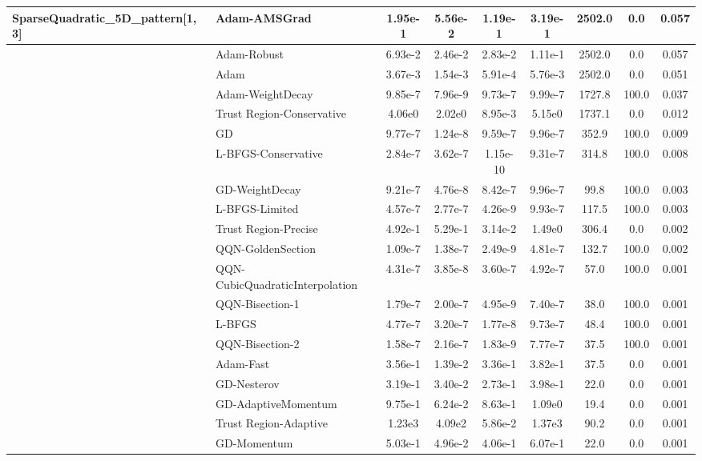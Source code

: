 \documentclass{article}
\begin{document}
\begin{longtable}{|l|l|c|c|c|c|c|c|c|}
SparseQuadratic\_5D\_pattern[1, 3] & \textbf{Adam-AMSGrad} & 1.95e-1 & 5.56e-2 & 1.19e-1 & 3.19e-1 & 2502.0 & 0.0 & 0.057 \\
\hline
 & Adam-Robust & 6.93e-2 & 2.46e-2 & 2.83e-2 & 1.11e-1 & 2502.0 & 0.0 & 0.057 \\
\hline
 & Adam & 3.67e-3 & 1.54e-3 & 5.91e-4 & 5.76e-3 & 2502.0 & 0.0 & 0.051 \\
\hline
 & Adam-WeightDecay & 9.85e-7 & 7.96e-9 & 9.73e-7 & 9.99e-7 & 1727.8 & 100.0 & 0.037 \\
\hline
 & Trust Region-Conservative & 4.06e0 & 2.02e0 & 8.95e-3 & 5.15e0 & 1737.1 & 0.0 & 0.012 \\
\hline
 & GD & 9.77e-7 & 1.24e-8 & 9.59e-7 & 9.96e-7 & 352.9 & 100.0 & 0.009 \\
\hline
 & L-BFGS-Conservative & 2.84e-7 & 3.62e-7 & 1.15e-10 & 9.31e-7 & 314.8 & 100.0 & 0.008 \\
\hline
 & GD-WeightDecay & 9.21e-7 & 4.76e-8 & 8.42e-7 & 9.96e-7 & 99.8 & 100.0 & 0.003 \\
\hline
 & L-BFGS-Limited & 4.57e-7 & 2.77e-7 & 4.26e-9 & 9.93e-7 & 117.5 & 100.0 & 0.003 \\
\hline
 & Trust Region-Precise & 4.92e-1 & 5.29e-1 & 3.14e-2 & 1.49e0 & 306.4 & 0.0 & 0.002 \\
\hline
 & QQN-GoldenSection & 1.09e-7 & 1.38e-7 & 2.49e-9 & 4.81e-7 & 132.7 & 100.0 & 0.002 \\
\hline
 & QQN-CubicQuadraticInterpolation & 4.31e-7 & 3.85e-8 & 3.60e-7 & 4.92e-7 & 57.0 & 100.0 & 0.001 \\
\hline
 & QQN-Bisection-1 & 1.79e-7 & 2.00e-7 & 4.95e-9 & 7.40e-7 & 38.0 & 100.0 & 0.001 \\
\hline
 & L-BFGS & 4.77e-7 & 3.20e-7 & 1.77e-8 & 9.73e-7 & 48.4 & 100.0 & 0.001 \\
\hline
 & QQN-Bisection-2 & 1.58e-7 & 2.16e-7 & 1.83e-9 & 7.77e-7 & 37.5 & 100.0 & 0.001 \\
\hline
 & Adam-Fast & 3.56e-1 & 1.39e-2 & 3.36e-1 & 3.82e-1 & 37.5 & 0.0 & 0.001 \\
\hline
 & GD-Nesterov & 3.19e-1 & 3.40e-2 & 2.73e-1 & 3.98e-1 & 22.0 & 0.0 & 0.001 \\
\hline
 & GD-AdaptiveMomentum & 9.75e-1 & 6.24e-2 & 8.63e-1 & 1.09e0 & 19.4 & 0.0 & 0.001 \\
\hline
 & Trust Region-Adaptive & 1.23e3 & 4.09e2 & 5.86e-2 & 1.37e3 & 90.2 & 0.0 & 0.001 \\
\hline
 & GD-Momentum & 5.03e-1 & 4.96e-2 & 4.06e-1 & 6.07e-1 & 22.0 & 0.0 & 0.001 \\

\end{longtable}
\end{document}
